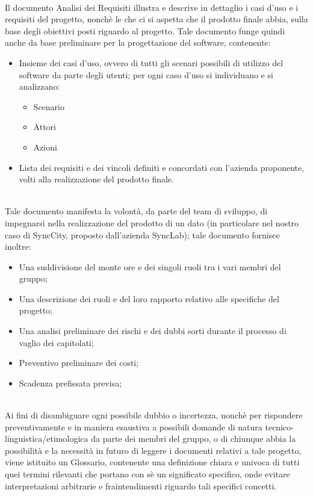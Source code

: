 \\
Il documento Analisi dei Requisiti illustra e descrive in dettaglio i casi d'uso e i requisiti del progetto, nonchè le  che ci si aspetta che il prodotto finale abbia, sulla base degli obiettivi posti riguardo al progetto. Tale documento funge quindi anche da base preliminare per la progettazione del software, contenente:
\begin{itemize}
    \item Insieme dei casi d'uso, ovvero di tutti gli scenari possibili di utilizzo del software da parte degli utenti; per ogni caso d'uso si individuano e si analizzano: 
    \begin{itemize}
        \item Scenario
        \item Attori
        \item Azioni
    \end{itemize} 
    \item Lista dei requisiti e dei vincoli definiti e concordati con l'azienda proponente, volti alla realizzazione del prodotto finale.
\end{itemize}

\\
Tale documento manifesta la volontà, da parte del team di sviluppo, di impegnarsi nella realizzazione del prodotto di un dato  (in particolare nel nostro caso di SyncCity, proposto dall'azienda SyncLab); tale documento fornisce inoltre:
\begin{itemize}
    \item Una suddivisione del monte ore e dei singoli ruoli tra i vari membri del gruppo;
    \item Una descrizione dei ruoli e del loro rapporto relativo alle specifiche del progetto;
    \item Una analisi preliminare dei rischi e dei dubbi sorti durante il processo di vaglio dei capitolati;
    \item Preventivo preliminare dei costi;
    \item Scadenza prefissata previsa;
\end{itemize}

\\
Ai fini di disambiguare ogni possibile dubbio o incertezza, nonchè per rispondere preventivamente e in maniera esaustiva a possibili domande di natura tecnico-linguistica/etimologica da parte dei membri del gruppo, o di chiunque abbia la possibilità e la necessità in futuro di leggere i documenti relativi a tale progetto, viene istituito un Glossario, contenente una definizione chiara e univoca di tutti quei termini rilevanti che portano con sè un significato specifico, onde evitare interpretazioni arbitrarie e fraintendimenti riguardo tali specifici concetti.

